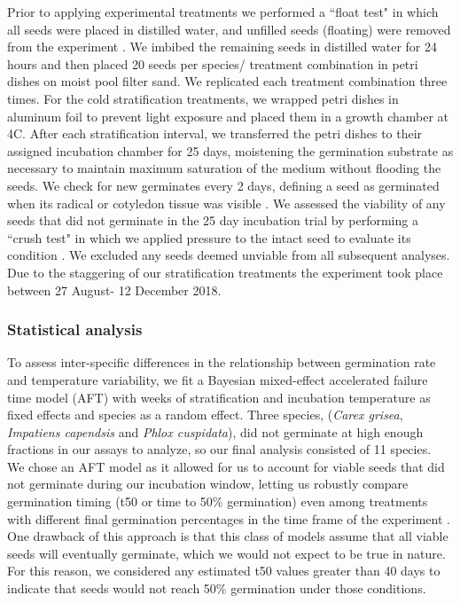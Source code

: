 \documentclass{article}\usepackage[]{graphicx}\usepackage[]{color}
\begin{document}
\noindent  Prior to applying experimental treatments we performed a ``float test" in which all seeds were placed in distilled water, and unfilled seeds (floating) were removed from the experiment \citep{Baskin2014}. We imbibed the remaining seeds in distilled water for 24 hours and then placed 20 seeds per species/ treatment combination in petri dishes on moist pool filter sand. We replicated each treatment combination three times. For the cold stratification treatments, we wrapped petri dishes in aluminum foil to prevent light exposure and placed them in a growth chamber at 4\degree C. After each stratification interval, we transferred the petri dishes to their assigned incubation chamber for 25 days, moistening the germination substrate as necessary to maintain maximum saturation of the medium without flooding the seeds. We check for new germinates every 2 days, defining a seed as germinated when its radical or cotyledon tissue was visible \citep{Baskin2014}. We assessed the viability of any seeds that did not germinate in the 25 day incubation trial by performing a ``crush test" in which we applied pressure to the intact seed to evaluate its condition \citep{Baskin2014}. We excluded any seeds deemed unviable from all subsequent analyses. Due to the staggering of our stratification treatments the experiment took place between 27 August- 12 December 2018.\\

\subsubsection*{Statistical analysis}
To assess inter-specific differences in the relationship between germination rate and temperature variability, we fit a Bayesian mixed-effect accelerated failure time model (AFT) with weeks of stratification and incubation temperature as fixed effects and species as a random effect. Three species, (\textit{Carex grisea}, \textit{Impatiens capendsis} and \textit{Phlox cuspidata}), did not germinate at high enough fractions in our assays to analyze, so our final analysis consisted of 11 species.\\ 

We chose an AFT model as it allowed for us to account for viable seeds that did not germinate during our incubation window, letting us robustly compare germination timing (t50 or time to 50\% germination) even among treatments with different final germination percentages in the time frame of the experiment \citep{Soltani:2015aa}. One drawback of this approach is that this class of models assume that all viable seeds will eventually germinate, which we would not expect to be true in nature. For this reason, we considered any estimated t50 values greater than 40 days to indicate that seeds would not reach 50\% germination under those conditions. \\ 
\end{document}
